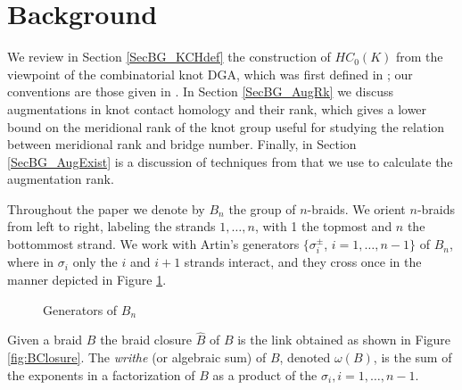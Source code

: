 \documentclass{amsart}[11pt,fullpage]
\def\s{{\sigma}}
\theoremstyle{definition}
\begin{document}
\section{Background}
\label{SecBG}

  We review in Section \ref{SecBG_KCHdef} the construction of $HC_0(K)$ from the viewpoint of the combinatorial knot DGA, which was first defined in \cite{Ng08}; our conventions are those given in \cite{Ng12}. In Section \ref{SecBG_AugRk} we discuss augmentations in knot contact homology and their rank, which gives a lower bound on the meridional rank of the knot group useful for studying the relation between meridional rank and bridge number. Finally, in Section \ref{SecBG_AugExist} is a discussion of techniques from \cite{Cor13a} that we use to calculate the augmentation rank.

  Throughout the paper we denote by $B_n$ the group of $n$-braids. We orient $n$-braids from left to right, labeling the strands $1,\ldots, n$, with 1 the topmost and $n$ the bottommost strand. We work with Artin's generators $\{\sigma_i^{\pm}$, $i=1,\ldots,n-1\}$ of $B_n$, where in $\s_i$ only the $i$ and $i+1$ strands interact, and they cross once in the manner depicted in Figure \ref{fig:BraidGens}.
      \begin{figure}[ht]
        \caption{Generators of $B_n$}
        \label{fig:BraidGens}
      \end{figure}
    Given a braid $B$ the braid closure $\widehat{B}$ of $B$ is the link obtained as shown in Figure \ref{fig:BClosure}. The \emph{writhe} (or algebraic sum) of $B$, denoted $\omega(B)$, is the sum of the exponents in a factorization of $B$ as a product of the $\s_i, i=1,\ldots,n-1$.
\end{document}
